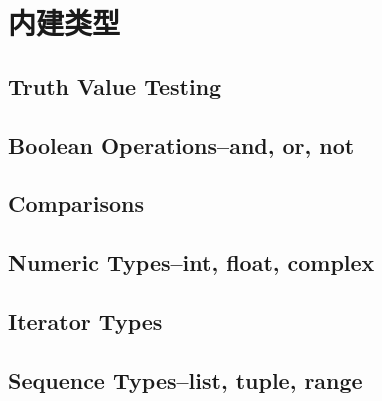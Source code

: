\chapter{内建类型}
\section{Truth Value Testing}
\section{Boolean Operations--and, or, not}
\section{Comparisons}
\section{Numeric Types--int, float, complex}
\section{Iterator Types}




\section{Sequence Types--list, tuple, range}
